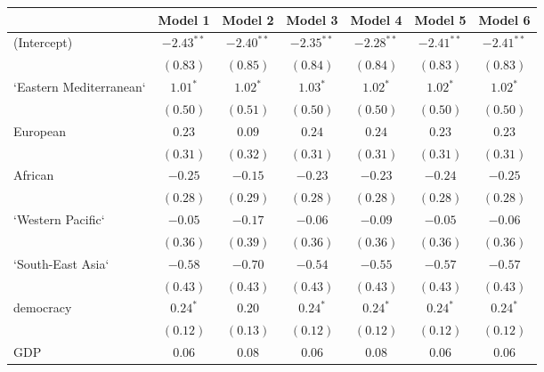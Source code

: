
\begin{table}[!h]
\begin{center}
\begin{tabular}{l c c c c c c }
\toprule
 & Model 1 & Model 2 & Model 3 & Model 4 & Model 5 & Model 6 \\
\midrule
(Intercept)             & $-2.43^{**}$ & $-2.40^{**}$ & $-2.35^{**}$ & $-2.28^{**}$ & $-2.41^{**}$ & $-2.41^{**}$ \\
                        & $(0.83)$     & $(0.85)$     & $(0.84)$     & $(0.84)$     & $(0.83)$     & $(0.83)$     \\
`Eastern Mediterranean` & $1.01^{*}$   & $1.02^{*}$   & $1.03^{*}$   & $1.02^{*}$   & $1.02^{*}$   & $1.02^{*}$   \\
                        & $(0.50)$     & $(0.51)$     & $(0.50)$     & $(0.50)$     & $(0.50)$     & $(0.50)$     \\
European                & $0.23$       & $0.09$       & $0.24$       & $0.24$       & $0.23$       & $0.23$       \\
                        & $(0.31)$     & $(0.32)$     & $(0.31)$     & $(0.31)$     & $(0.31)$     & $(0.31)$     \\
African                 & $-0.25$      & $-0.15$      & $-0.23$      & $-0.23$      & $-0.24$      & $-0.25$      \\
                        & $(0.28)$     & $(0.29)$     & $(0.28)$     & $(0.28)$     & $(0.28)$     & $(0.28)$     \\
`Western Pacific`       & $-0.05$      & $-0.17$      & $-0.06$      & $-0.09$      & $-0.05$      & $-0.06$      \\
                        & $(0.36)$     & $(0.39)$     & $(0.36)$     & $(0.36)$     & $(0.36)$     & $(0.36)$     \\
`South-East Asia`       & $-0.58$      & $-0.70$      & $-0.54$      & $-0.55$      & $-0.57$      & $-0.57$      \\
                        & $(0.43)$     & $(0.43)$     & $(0.43)$     & $(0.43)$     & $(0.43)$     & $(0.43)$     \\
democracy               & $0.24^{*}$   & $0.20$       & $0.24^{*}$   & $0.24^{*}$   & $0.24^{*}$   & $0.24^{*}$   \\
                        & $(0.12)$     & $(0.13)$     & $(0.12)$     & $(0.12)$     & $(0.12)$     & $(0.12)$     \\
GDP                     & $0.06$       & $0.08$       & $0.06$       & $0.08$       & $0.06$       & $0.06$       \\

\end{tabular}
\end{center}
\end{table}
